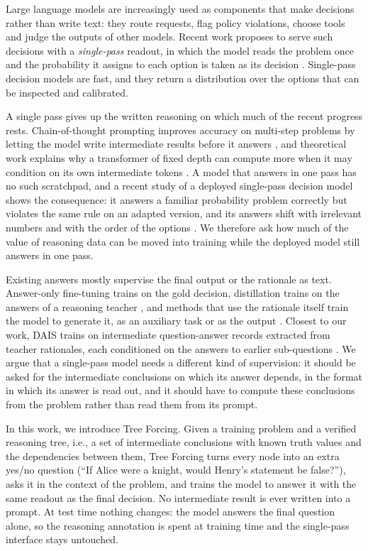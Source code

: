 \documentclass[10pt]{article}
\newcommand{\tf}{Tree Forcing}
\begin{document}
Large language models are increasingly used as components that make decisions rather than write text: they route
requests, flag policy violations, choose tools and judge the outputs of other models. Recent work proposes to serve
such decisions with a \emph{single-pass} readout, in which the model reads the problem once and the probability it
assigns to each option is taken as its decision \citep{ldm2026}. Single-pass decision models are fast, and they return
a distribution over the options that can be inspected and calibrated.

A single pass gives up the written reasoning on which much of the recent progress rests. Chain-of-thought prompting improves accuracy on multi-step problems by letting
the model write intermediate results before it answers \citep{wei2022cot}, and theoretical work explains why a
transformer of fixed depth can compute more when it may condition on its own intermediate tokens
\citep{feng2023mystery,merrill2024expressive}. A model that answers in one pass has no such scratchpad, and a recent
study of a deployed single-pass decision model shows the consequence: it answers a familiar probability problem
correctly but violates the same rule on an adapted version, and its answers shift with irrelevant numbers and with the
order of the options \citep{imperatrice2026jevbias}. We therefore ask how much of the value of reasoning data can be
moved into training while the deployed model still answers in one pass.

Existing answers mostly supervise the final output or the rationale as text. Answer-only fine-tuning trains on the gold
decision, distillation trains on the answers of a reasoning teacher \citep{yu2024system2}, and methods that use the
rationale itself train the model to generate it, as an auxiliary task \citep{hsieh2023dss,li2022explanations} or as
the output \citep{ho2023teachers,shridhar2023socratic}. Closest to our work, DAIS trains on intermediate
question-answer records extracted from teacher rationales, each conditioned on the answers to earlier sub-questions
\citep{dais2026}. We argue that a single-pass model needs a different kind of supervision: it should be asked for the
intermediate conclusions on which its answer depends, in the format in which its answer is read out, and it should
have to compute these conclusions from the problem rather than read them from its prompt.

In this work, we introduce \tf{}. Given a training problem and a verified reasoning tree, i.e., a set of intermediate
conclusions with known truth values and the dependencies between them, \tf{} turns every node into an extra yes/no
question (``If Alice were a knight, would Henry's statement be false?''), asks it in the context of the problem, and
trains the model to answer it with the same readout as the final decision. No intermediate result is ever written into
a prompt. At test time nothing changes: the model answers the final question alone, so the reasoning annotation is
spent at training time and the single-pass interface stays untouched.
\end{document}
